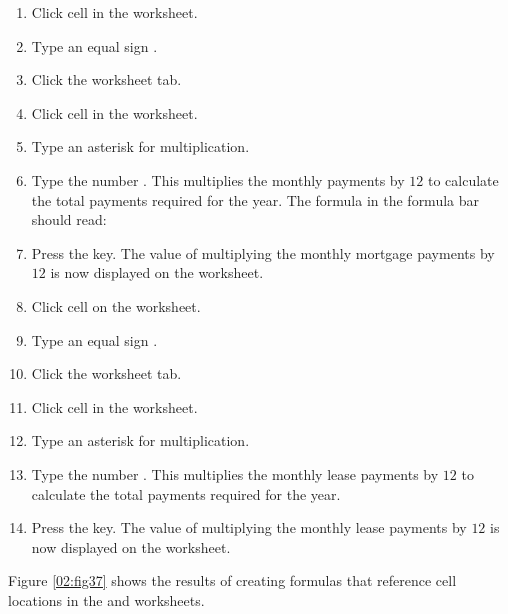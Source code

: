 \begin{enumerate}
	\item Click cell  in the  worksheet.
	\item Type an equal sign \fmtTyping{=}.
	\item Click the  worksheet tab.
	\item Click cell  in the  worksheet.
	\item Type an asterisk \fmtTyping{*} for multiplication.
	\item Type the number . This multiplies the monthly payments by $ 12 $ to calculate the total payments required for the year. The formula in the formula bar should read: 
	\item Press the  key. The value of multiplying the monthly mortgage payments by $ 12 $ is now displayed on the  worksheet.
	\item Click cell  on the  worksheet.
	\item Type an equal sign \fmtTyping{=}.
	\item Click the  worksheet tab.
	\item Click cell  in the  worksheet.
	\item Type an asterisk \fmtTyping{*} for multiplication.
	\item Type the number . This multiplies the monthly lease payments by $ 12 $ to calculate the total payments required for the year.
	\item Press the  key. The value of multiplying the monthly lease payments by $ 12 $ is now displayed on the  worksheet.
\end{enumerate}

Figure \ref{02:fig37} shows the results of creating formulas that reference cell locations in the  and  worksheets.

